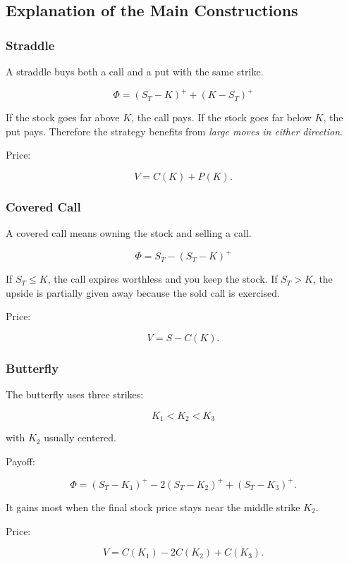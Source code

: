 \documentclass[11pt]{article}
\begin{document}
\subsection*{Explanation of the Main Constructions}

\subsubsection*{Straddle}

A straddle buys both a call and a put with the same strike.

\[
\Phi=(S_T-K)^+ + (K-S_T)^+
\]

If the stock goes far above $K$, the call pays.  
If the stock goes far below $K$, the put pays.  
Therefore the strategy benefits from \emph{large moves in either direction}.

Price:

\[
V=C(K)+P(K).
\]

\subsubsection*{Covered Call}

A covered call means owning the stock and selling a call.

\[
\Phi=S_T-(S_T-K)^+
\]

If $S_T\le K$, the call expires worthless and you keep the stock.  
If $S_T>K$, the upside is partially given away because the sold call is exercised.

Price:

\[
V=S-C(K).
\]

\subsubsection*{Butterfly}

The butterfly uses three strikes:

\[
K_1<K_2<K_3
\]

with $K_2$ usually centered.

Payoff:

\[
\Phi=(S_T-K_1)^+-2(S_T-K_2)^++(S_T-K_3)^+.
\]

It gains most when the final stock price stays near the middle strike $K_2$.

Price:

\[
V=C(K_1)-2C(K_2)+C(K_3).
\]
\end{document}
